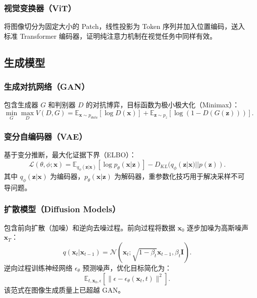 \documentclass[12pt,a4paper]{ctexart}
\begin{document}
\subsubsection{视觉变换器（ViT）}
将图像切分为固定大小的 Patch，线性投影为 Token 序列并加入位置编码，送入标准 Transformer 编码器，证明纯注意力机制在视觉任务中同样有效。

\subsection{生成模型}

\subsubsection{生成对抗网络（GAN）}
包含生成器 $G$ 和判别器 $D$ 的对抗博弈，目标函数为极小极大化（Minimax）：
\begin{equation}
    \min_G \max_D V(D, G) = \mathbb{E}_{\mathbf{x} \sim p_{data}}[\log D(\mathbf{x})] + \mathbb{E}_{\mathbf{z} \sim p_z}[\log(1 - D(G(\mathbf{z})))].
\end{equation}

\subsubsection{变分自编码器（VAE）}
基于变分推断，最大化证据下界（ELBO）：
\begin{equation}
    \mathcal{L}(\theta, \phi; \mathbf{x}) = \mathbb{E}_{q_\phi(\mathbf{z}|\mathbf{x})}[\log p_\theta(\mathbf{x}|\mathbf{z})] - D_{KL}(q_\phi(\mathbf{z}|\mathbf{x}) || p(\mathbf{z})).
\end{equation}
其中 $q_\phi(\mathbf{z}|\mathbf{x})$ 为编码器，$p_\theta(\mathbf{x}|\mathbf{z})$ 为解码器，重参数化技巧用于解决采样不可导问题。

\subsubsection{扩散模型（Diffusion Models）}
包含前向扩散（加噪）和逆向去噪过程。前向过程将数据 $\mathbf{x}_0$ 逐步加噪为高斯噪声 $\mathbf{x}_T$：
\begin{equation}
    q(\mathbf{x}_t | \mathbf{x}_{t-1}) = \mathcal{N}(\mathbf{x}_t; \sqrt{1-\beta_t} \mathbf{x}_{t-1}, \beta_t \mathbf{I}).
\end{equation}
逆向过程训练神经网络 $\epsilon_\theta$ 预测噪声，优化目标简化为：
\begin{equation}
    \mathbb{E}_{t, \mathbf{x}_0, \epsilon} \left[ \|\epsilon - \epsilon_\theta(\mathbf{x}_t, t)\|^2 \right].
\end{equation}
该范式在图像生成质量上已超越 GAN。
\end{document}
